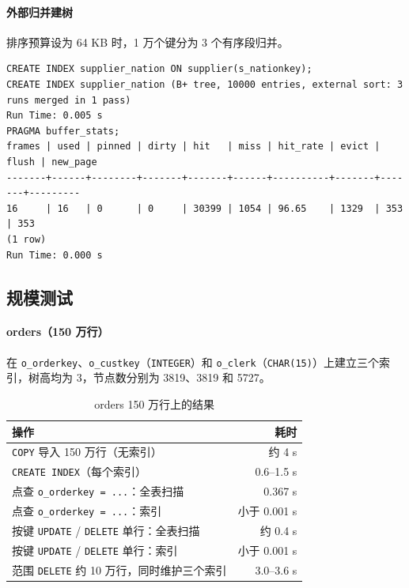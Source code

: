 \documentclass[11pt,a4paper]{ctexart}
\newcommand{\code}[1]{\texttt{#1}}
\begin{document}
\paragraph{外部归并建树}排序预算设为 64 KB 时，1 万个键分为 3 个有序段归并。
\begin{lstlisting}[style=wide]
CREATE INDEX supplier_nation ON supplier(s_nationkey);
CREATE INDEX supplier_nation (B+ tree, 10000 entries, external sort: 3 runs merged in 1 pass)
Run Time: 0.005 s
PRAGMA buffer_stats;
frames | used | pinned | dirty | hit   | miss | hit_rate | evict | flush | new_page
-------+------+--------+-------+-------+------+----------+-------+-------+---------
16     | 16   | 0      | 0     | 30399 | 1054 | 96.65    | 1329  | 353   | 353
(1 row)
Run Time: 0.000 s
\end{lstlisting}

\subsection{规模测试}

\paragraph{orders（150 万行）}在 \code{o\_orderkey}、\code{o\_custkey}（\code{INTEGER}）和 \code{o\_clerk}（\code{CHAR(15)}）上建立三个索引，树高均为 3，节点数分别为 3819、3819 和 5727。

\begin{table}[H]
  \centering
  \caption{orders 150 万行上的结果}
  \label{tab:orders}
  \begin{tabular}{lr}
    \toprule
    操作 & 耗时 \\
    \midrule
    \code{COPY} 导入 150 万行（无索引） & 约 4 s \\
    \code{CREATE INDEX}（每个索引） & 0.6--1.5 s \\
    点查 \code{o\_orderkey = ...}：全表扫描 & 0.367 s \\
    点查 \code{o\_orderkey = ...}：索引 & 小于 0.001 s \\
    按键 \code{UPDATE} / \code{DELETE} 单行：全表扫描 & 约 0.4 s \\
    按键 \code{UPDATE} / \code{DELETE} 单行：索引 & 小于 0.001 s \\
    范围 \code{DELETE} 约 10 万行，同时维护三个索引 & 3.0--3.6 s \\
    \bottomrule
  \end{tabular}
\end{table}
\end{document}
